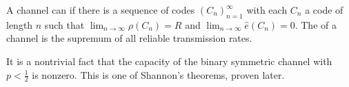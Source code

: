 \begin{definition}
    A channel can  if there is a sequence of codes $(C_n)_{n=1}^\infty$ with each $C_n$ a code of length $n$ such that $\lim_{n \to \infty} \rho(C_n) = R$ and $\lim_{n \to \infty} \hat e(C_n) = 0$.
    The  of a channel is the supremum of all reliable transmission rates.
\end{definition}
It is a nontrivial fact that the capacity of the binary symmetric channel with $p < \frac{1}{2}$ is nonzero.
This is one of Shannon's theorems, proven later.

